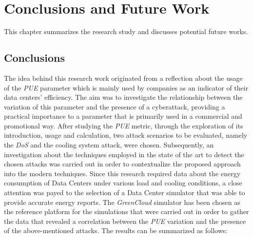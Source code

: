 \chapter{Conclusions and Future Work}

\begin{citazione}
This chapter summarizes the research study
and discusses potential future works.
\end{citazione}
\newpage

\section{Conclusions} 
The idea behind this research work originated from a reflection about the usage of the \emph{PUE} parameter which is mainly used by companies as an indicator of their data centers' efficiency. The aim was to investigate the relationship between the variation of this parameter and the presence of a cyberattack, providing a practical importance to a parameter that is primarily used in a commercial and promotional way. After studying the \emph{PUE} metric, through the exploration of its introduction, usage and calculation, two attack scenarios to be evaluated, namely the \emph{DoS} and the cooling system attack, were chosen. Subsequently, an investigation about the techniques employed in the state of the art to detect the chosen attacks was carried out in order to contextualize the proposed approach into the modern techniques. Since this research required data about the energy consumption of Data Centers under various load and cooling conditions, a close attention was payed to the selection of a Data Center simulator that was able to provide accurate energy reports. The \emph{GreenCloud} simulator has been chosen as the reference platform for the simulations that were carried out in order to gather the data that revealed a correlation between the \emph{PUE} variation and the presence of the above-mentioned attacks. The results can be summarized as follows:
